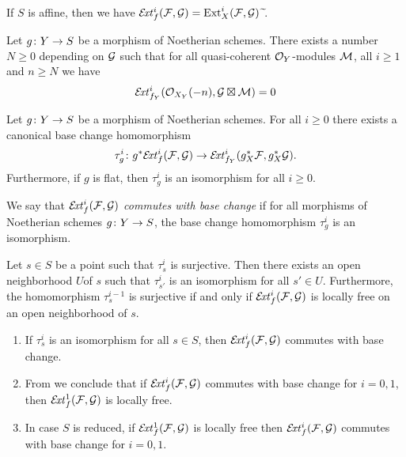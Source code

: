 \begin{remark}
	If $S$ is affine, then we have $\EXT^i_f(\mc{F},\mc{G})=\Ext^i_X(\mc{F},\mc{G}){\ \widetilde{}}$.
\end{remark}

\begin{proposition}
	Let $g \colon Y \to S$ be a morphism of Noetherian schemes.
	There exists a number $N\geq 0$ depending on $\mathcal{G}$ such that for all quasi-coherent $\mathcal{O}_Y$-modules $\mathcal{M}$, all $i\geq 1$ and $n\geq N$ we have
	\[
		\mathcal{E}\!\mathit{xt}^i_{f_Y}(\mathcal{O}_{X_Y}(-n),\mathcal{G} \boxtimes \mathcal{M}) = 0
	\]
\end{proposition}

\begin{proposition}
	Let $g \colon Y \to S$ be a morphism of Noetherian schemes.
	For all $i\geq 0$ there exists a canonical base change homomorphism
	\[
		\tau^i_{g} \colon g^{*}\mathcal{E}\!\mathit{xt}^i_{f}
		(\mathcal{F},\mathcal{G})
		\to
		\mathcal{E}\!\mathit{xt}^i_{f_Y}
		(g_X^{*}\mathcal{F}, g_X^{*}\mathcal{G}).
	\]
	Furthermore, if $g$ is flat, then $\tau^i_g$ is an isomorphism for all $i\geq 0$.
\end{proposition}

\begin{definition}
	We say that $\mathcal{E}\!\mathit{xt}^i_{f}(\mathcal{F},\mathcal{G})$ \emph{commutes with base change} if for all morphisms of Noetherian schemes $g \colon Y \to S$, the base change homomorphism $\tau^i_g$ is an isomorphism.
\end{definition}

\begin{proposition}
\label{prop:ext-base-change}
	Let $s \in S$ be a point such that $\tau^i_s$ is surjective. Then there exists an open neighborhood $U$of $s$ such that $\tau^i_{s'}$ is an isomorphism for all $s'\in U$.
	Furthermore, the homomorphism $\tau^{i-1}_{s}$ is surjective if and only if $\mathcal{E}\!\mathit{xt}^i_{f}(\mathcal{F},\mathcal{G})$ is locally free on an open neighborhood of $s$.
\end{proposition}

\begin{remark}
\begin{enumerate}
	\item If $\tau^i_{s}$ is an isomorphism for all $s\in S$, then $\mathcal{E}\!\mathit{xt}_{f}^i(\mathcal{F},\mathcal{G})$ commutes with base change.

	\item From  we conclude that if $\mathcal{E}\!\mathit{xt}^i_f(\mathcal{F},\mathcal{G})$ commutes with base change for $i=0,1$, then $\mathcal{E}\!\mathit{xt}^1_f(\mathcal{F},\mathcal{G})$ is locally free.

	\item In case $S$ is reduced, if $\mathcal{E}\!\mathit{xt}^1_f(\mathcal{F},\mathcal{G})$ is locally free then $\mathcal{E}\!\mathit{xt}^i_f(\mathcal{F},\mathcal{G})$ commutes with base change for $i=0,1$.
\end{enumerate}
\end{remark}

